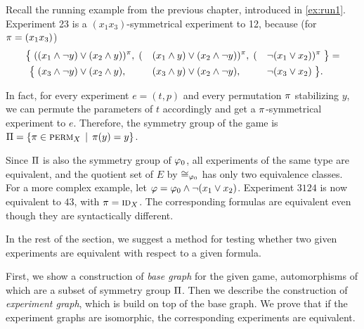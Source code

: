 \begin{example}
Recall the running example from the previous chapter, introduced in \autoref{ex:run1}.
Experiment 23 is a $(x_1x_3)$-symmetrical experiment to 12, because (for $\pi = (x_1x_3)$)
\begin{alignat*}{5}
\big\{ \;(&(x_1 \wedge \neg y) \vee (x_2\wedge y))^\pi,\;
   (&&(x_1 \wedge y) \vee (x_2\wedge\neg y))^\pi,\;
   (&&\neg (x_1  \vee x_2))^\pi \;\big\} = \\
\big\{ \;&(x_3 \wedge \neg y) \vee (x_2\wedge y),
   &&(x_3 \wedge y) \vee (x_2\wedge\neg y),
   &&\neg (x_3 \vee x_2)\; \big\}.
\end{alignat*}

In fact, for every experiment $e = (t, p)$ and every permutation $\pi$ stabilizing $y$,
  we can permute the parameters of $t$ accordingly and get a $\pi$-symmetrical experiment to $e$.
Therefore, the symmetry group of the game is $\Pi = \{\pi\in\textsc{perm}_X \:\:|\:\: \pi(y) = y\}$.

Since $\Pi$ is also the symmetry group of $\varphi_0$,
  all experiments of the same type are equivalent,
  and the quotient set of $E$ by $\cong_{\varphi_0}$
  has only two equivalence classes.
For a more complex example, let $\varphi = \varphi_0\wedge\neg(x_1\vee x_2)$.
Experiment $3124$ is now equivalent to $43$, with $\pi = \textsc{id}_X$.
The corresponding formulas are equivalent even though they
  are syntactically different.
\end{example}

In the rest of the section, we suggest a method for testing
  whether two given experiments are equivalent with respect to a given formula.

First, we show a construction of \emph{base graph} for the given game,
  automorphisms of which are a subset of symmetry group $\Pi$.
Then we describe the construction of \emph{experiment graph},
  which is build on top of the base graph.
  We prove
  that if the experiment graphs are isomorphic,
  the corresponding experiments are equivalent.

